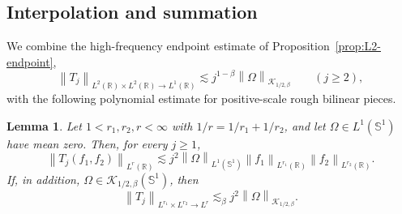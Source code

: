 \documentclass[11pt]{amsart}
\newtheorem{lemma}[definition]{Lemma}
\theoremstyle{remark}
\numberwithin{equation}{section}
\newcommand{\R}{\mathbb R}
\newcommand{\Sph}{\mathbb S^1}
\newcommand{\cK}{\mathcal K}
\newcommand{\norm}[1]{\left\lVert #1\right\rVert}
\begin{document}
	\subsection{Interpolation and summation}
	
	We combine the high-frequency endpoint estimate of
	Proposition~\ref{prop:L2-endpoint},
	\[
	\norm{T_j}_{L^2(\R)\times L^2(\R)\to L^1(\R)}
	\lesssim
	j^{1-\beta}\norm{\Omega}_{\cK_{1/2,\beta}}
	\qquad (j\ge2),
	\]
	with the following polynomial estimate for positive-scale rough bilinear
	pieces.
	
	\begin{lemma}\label{lem:poly-growth}
		Let \(1<r_1,r_2,r<\infty\) with
		\(1/r=1/r_1+1/r_2\), and let
		\(\Omega\in L^1(\Sph)\) have mean zero. Then, for every \(j\ge1\),
		\[
		\norm{T_j(f_1,f_2)}_{L^r(\R)}
		\lesssim
		j^2\norm{\Omega}_{L^1(\Sph)}
		\norm{f_1}_{L^{r_1}(\R)}
		\norm{f_2}_{L^{r_2}(\R)}.
		\]
		If, in addition, \(\Omega\in\cK_{1/2,\beta}(\Sph)\), then
		\[
		\norm{T_j}_{L^{r_1}\times L^{r_2}\to L^r}
		\lesssim_\beta
		j^2\norm{\Omega}_{\cK_{1/2,\beta}}.
		\]
	\end{lemma}
	
\end{document}

